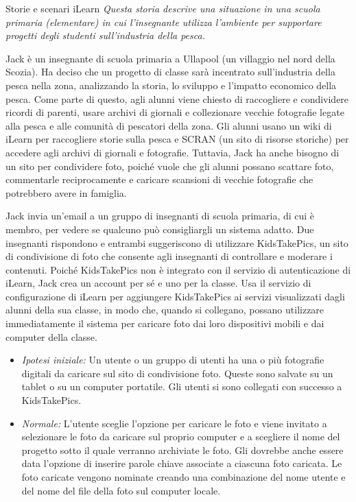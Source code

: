\begin{Example}{Storie e scenari iLearn}{}
\textit{Questa storia descrive una situazione in una scuola primaria (elementare) in cui l'insegnante utilizza l'ambiente per supportare progetti degli studenti sull'industria della pesca.}

Jack è un insegnante di scuola primaria a Ullapool (un villaggio nel nord della Scozia). Ha deciso che un progetto di classe sarà incentrato sull’industria della pesca nella zona, analizzando la storia, lo sviluppo e l’impatto economico della pesca. Come parte di questo, agli alunni viene chiesto di raccogliere e condividere ricordi di parenti, usare archivi di giornali e collezionare vecchie fotografie legate alla pesca e alle comunità di pescatori della zona. Gli alunni usano un wiki di iLearn per raccogliere storie sulla pesca e SCRAN (un sito di risorse storiche) per accedere agli archivi di giornali e fotografie. Tuttavia, Jack ha anche bisogno di un sito per condividere foto, poiché vuole che gli alunni possano scattare foto, commentarle reciprocamente e caricare scansioni di vecchie fotografie che potrebbero avere in famiglia.

Jack invia un’email a un gruppo di insegnanti di scuola primaria, di cui è membro, per vedere se qualcuno può consigliargli un sistema adatto. Due insegnanti rispondono e entrambi suggeriscono di utilizzare KidsTakePics, un sito di condivisione di foto che consente agli insegnanti di controllare e moderare i contenuti. Poiché KidsTakePics non è integrato con il servizio di autenticazione di iLearn, Jack crea un account per sé e uno per la classe. Usa il servizio di configurazione di iLearn per aggiungere KidsTakePics ai servizi visualizzati dagli alunni della sua classe, in modo che, quando si collegano, possano utilizzare immediatamente il sistema per caricare foto dai loro dispositivi mobili e dai computer della classe.
\begin{itemize}
    \item \textit{Ipotesi iniziale:} Un utente o un gruppo di utenti ha una o più fotografie digitali da caricare sul sito di condivisione foto. Queste sono salvate su un tablet o su un computer portatile. Gli utenti si sono collegati con successo a KidsTakePics.

    \item \textit{Normale:} L’utente sceglie l’opzione per caricare le foto e viene invitato a selezionare le foto da caricare sul proprio computer e a scegliere il nome del progetto sotto il quale verranno archiviate le foto. Gli dovrebbe anche essere data l’opzione di inserire parole chiave associate a ciascuna foto caricata. Le foto caricate vengono nominate creando una combinazione del nome utente e del nome del file della foto sul computer locale.
    

\end{itemize}
\end{Example}
